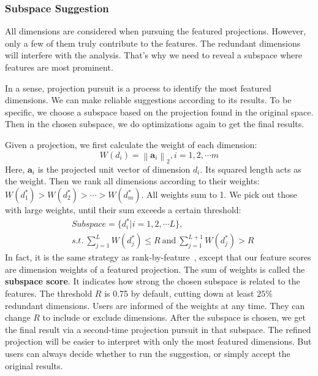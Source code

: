 \subsubsection{Subspace Suggestion}
All dimensions are considered when pursuing the featured projections. However, only a few of them truly contribute to the features. The redundant dimensions will interfere with the analysis. That's why we need to reveal a subspace where features are most prominent.

In a sense, projection pursuit is a process to identify the most featured dimensions. We can make reliable suggestions according to its results. To be specific, we choose a subspace based on the projection found in the original space. Then in the chosen subspace, we do optimizations again to get the final results.

Given a projection, we first calculate the weight of each dimension:
\begin{equation}
W(d_{i}) = \left \|  \mathbf{a}_{i}\right \|_{2}, i = 1,2,\cdots m
\end{equation}
Here, $\mathbf{a}_{i}$ is the projected unit vector of dimension $d_{i}$. Its squared length acts as the weight. Then we rank all dimensions according to their weights: $W(d_{1}^{*}) > W(d_{2}^{*}) > \cdots >W(d_{m}^{*})$. All weights sum to 1. We pick out those with large weights, until their sum exceeds a certain threshold:
\begin{equation}
\begin{split}
&Subspace = \{d_{i}^{*}| i = 1,2, \cdots L \},\\
&s.t.\ \sum\limits_{j=1}^{L} W(d_{j}^{*}) \leq R \ \text{and}\ \sum\limits_{j=1}^{L+1} W(d_{j}^{*}) > R
\end{split}
\end{equation}
In fact, it is the same strategy as rank-by-feature~\cite{DBLP:journals/ivs/SeoS05}, except that our feature scores are dimension weights of a featured projection. The sum of weights is called the \textbf{subspace score}. It indicates how strong the chosen subspace is related to the features. The threshold $R$ is 0.75 by default, cutting down at least $25\%$ redundant dimensions. Users are informed of the weights at any time. They can change $R$ to include or exclude dimensions. After the subspace is chosen, we get the final result via a second-time projection pursuit in that subspace. The refined projection will be easier to interpret with only the most featured dimensions. But users can always decide whether to run the suggestion, or simply accept the original results.

